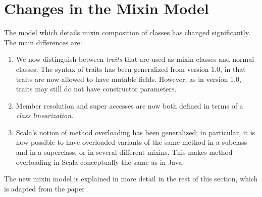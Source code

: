 \documentclass[a4paper,11pt,twoside]{article}
\begin{document}
\section{Changes in the Mixin Model}\label{traits}

The model which details mixin composition of classes has changed
significantly. The main differences are:
\begin{enumerate}
\item
We now distinguish between {\em traits} that are used as mixin classes
and normal classes. The syntax of traits has been generalized from
version 1.0, in that traits are now allowed to have mutable
fields. However, as in version 1.0, traits may still do not have
constructor parameters.
\item
Member resolution and super accesses are now both defined in terms of
a {\em class linearization}. 
\item
Scala's notion of method overloading has been generalized; in
 particular, it is now possible to have overloaded variants of the
 same method in a subclass and in a superclass, or in several different
 mixins. This makes method overloading in Scala conceptually the
 same as in Java.
\end{enumerate}

The new mixin model is explained in more detail in the rest of this
section, which is adapted from the paper \cite{odersky05sca}.
\end{document}
